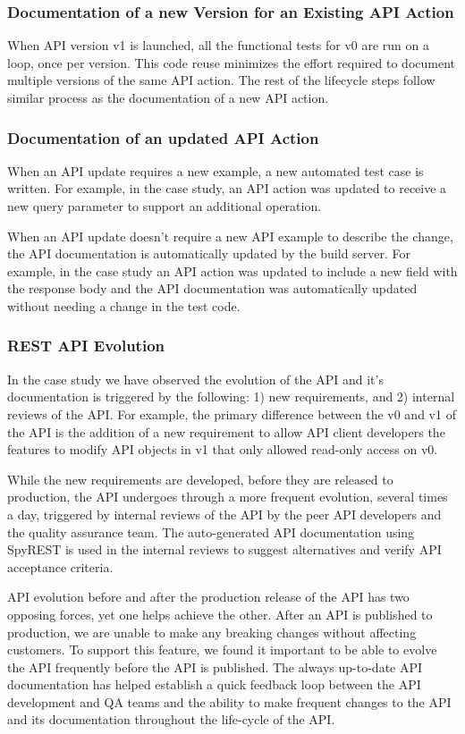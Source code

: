 \documentclass[10pt, conference]{IEEEtran}
\begin{document}
\subsubsection{Documentation of a new Version for an Existing API Action}

When API version v1 is launched, all the functional tests for v0 are run on a loop, once per version. This code reuse minimizes the effort required to document multiple versions of the same API action. The rest of the lifecycle steps follow similar process as the documentation of a new API action.

\subsubsection{Documentation of an updated API Action}
When an API update requires a new example, a new automated test case is written. For example, in the case study, an API action was updated to receive a new query parameter to support an additional operation.

When an API update doesn't require a new API example to describe the change, the API documentation is automatically updated by the build server. For example, in the case study an API action was updated to include a new field with the response body and the API documentation was automatically updated without needing a change in the test code.

\subsubsection{REST API Evolution} %
\label{sub:rest_api_evolution}
In the case study we have observed the evolution of the API and it's documentation is triggered by the following: 1) new requirements, and 2) internal reviews of the API. For example, the primary difference between the v0 and v1 of the API is the addition of a new requirement to allow API client developers the features to modify API objects in v1 that only allowed read-only access on v0.

While the new requirements are developed, before they are released to production, the API undergoes through a more frequent evolution, several times a day, triggered by internal reviews of the API by the peer API developers and the quality assurance team. The auto-generated API documentation using SpyREST is used in the internal reviews to suggest alternatives and verify API acceptance criteria.

API evolution before and after the production release of the API has two opposing forces, yet one helps achieve the other. After an API is published to production, we are unable to make any breaking changes without affecting customers. To support this feature, we found it important to be able to evolve the API frequently before the API is published. The always up-to-date API documentation has helped establish a quick feedback loop between the API development and QA teams and the ability to make frequent changes to the API and its documentation throughout the life-cycle of the API.
\end{document}
